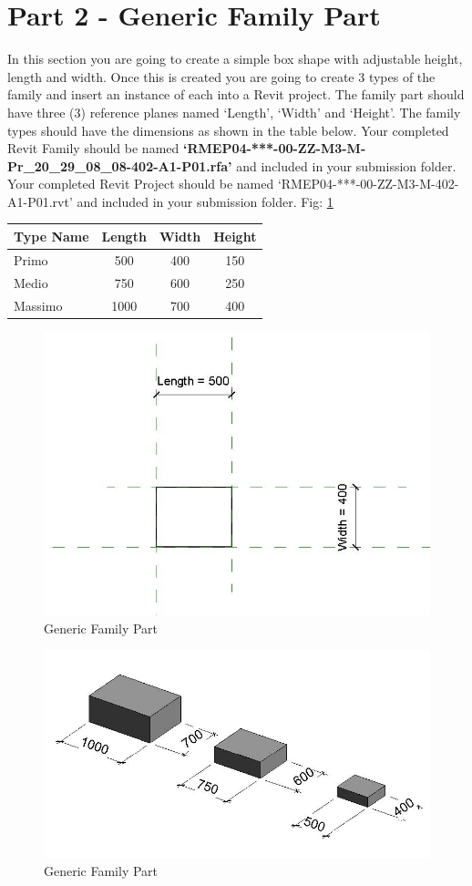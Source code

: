 \newpage


\section*{Part 2 - Generic Family Part}
In this section you are going to create a simple box shape with adjustable height, length and width. Once this is created you are going to create 3 types of the family and insert an instance of each into a Revit project. The family part should have three (3) reference planes named ‘Length’, ‘Width’ and ‘Height’. The family types should have the dimensions as shown in the table below.  Your completed Revit Family should be named \textbf{‘RMEP04-***-00-ZZ-M3-M-Pr\_20\_29\_08\_08-402-A1-P01.rfa’} and included in your submission folder.  Your completed Revit Project should be named ‘RMEP04-***-00-ZZ-M3-M-402-A1-P01.rvt’ and included in your submission folder. Fig: \ref{fig:GenericFamilyPart1}\\


\begin{tabularx}{\textwidth}{ |X|c|c|c| }
	\hline
	\textbf{Type Name} & Length & Width & Height \\
	\hline 
	Primo & 500 & 400 & 150\\
	Medio & 750 & 600 & 250\\
	Massimo & 1000 & 700 & 400\\
	\hline
\end{tabularx}


\begin{figure}[h]
	\centering
	\includegraphics[width=0.7\linewidth]{./img/ParaBox1.jpg}
	\caption{Generic Family Part}
	\label{fig:GenericFamilyPart1}
\end{figure}


\begin{figure}[h]
	\centering
	\includegraphics[width=0.7\linewidth]{./img/ParaBox2.jpg}
	\caption{Generic Family Part}
	\label{fig:GenericFamilyPart2}
\end{figure}


